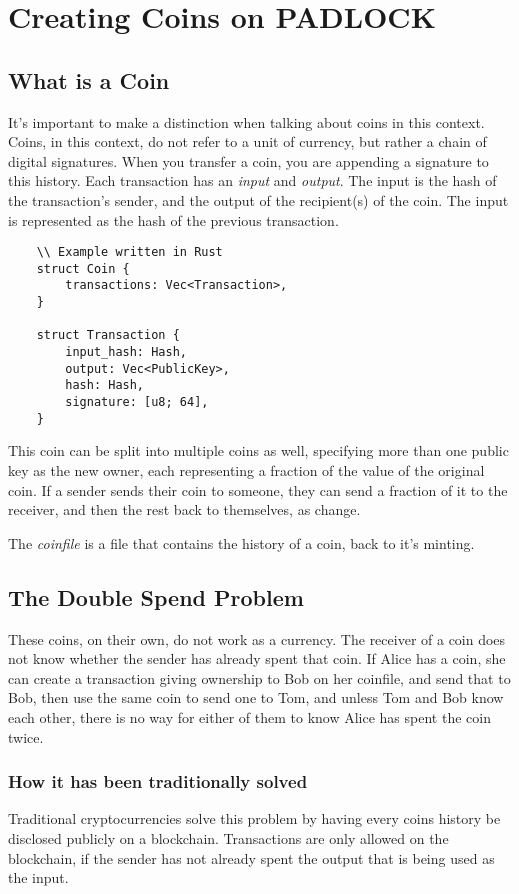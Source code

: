 \documentclass[12pt, letterpaper]{article} \usepackage[utf8]{inputenc}
\begin{document}
\section{Creating Coins on PADLOCK}

\subsection{What is a Coin} It's important to make a distinction when talking
about coins in this context. Coins, in this context, do not refer to a unit of
currency, but rather a chain of digital signatures. When you transfer a coin,
you are appending a signature to this history. Each transaction has an
\textit{input} and \textit{output}. The input is the hash of the transaction's
sender, and the output of the recipient(s) of the coin. The input is
represented as the hash of the previous transaction.

\begin{verbatim}
    \\ Example written in Rust
    struct Coin {
        transactions: Vec<Transaction>,
    }
     
    struct Transaction {
        input_hash: Hash,
        output: Vec<PublicKey>,
        hash: Hash,
        signature: [u8; 64],
    }
\end{verbatim}

This coin can be split into multiple coins as well, specifying more than one
public key as the new owner, each representing a fraction of the value of the
original coin. If a sender sends their coin to someone, they can send a
fraction of it to the receiver, and then the rest back to themselves, as change.

The \textit{coinfile} is a file that contains the history of a coin, back to
it's minting.

\subsection{The Double Spend Problem} These coins, on their own, do not work as
a currency. The receiver of a coin does not know whether the sender has already
spent that coin. If Alice has a coin, she can create a transaction giving
ownership to Bob on her coinfile, and send that to Bob, then use the same coin
to send one to Tom, and unless Tom and Bob know each other, there is no way for
either of them to know Alice has spent the coin twice.

\subsubsection{How it has been traditionally solved} Traditional
cryptocurrencies solve this problem by having every coins history be disclosed
publicly on a blockchain. Transactions are only allowed on the blockchain, if
the sender has not already spent the output that is being used as the input.
\end{document}
